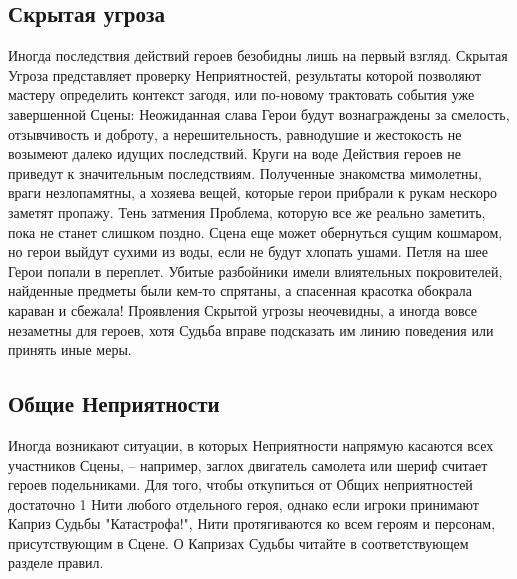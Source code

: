 \subsection{Скрытая угроза}
Иногда последствия действий героев безобидны лишь на первый взгляд. Скрытая Угроза представляет проверку Неприятностей, результаты которой позволяют мастеру определить контекст загодя, или по-новому трактовать события уже завершенной Сцены:
\trouble
{Неожиданная слава}%
{Герои будут вознаграждены за смелость, отзывчивость и доброту, а нерешительность, равнодушие и жестокость не возымеют далеко идущих последствий.}%
{Круги на воде}%
{Действия героев не приведут к значительным последствиям. Полученные знакомства мимолетны, враги незлопамятны, а хозяева вещей, которые герои прибрали к рукам нескоро заметят пропажу.}%
{Тень затмения}%
{Проблема, которую все же реально заметить, пока не станет слишком поздно. Сцена еще может обернуться сущим кошмаром, но герои выйдут сухими из воды, если не будут хлопать ушами.}%
{Петля на шее}%
{Герои попали в переплет. Убитые разбойники имели влиятельных покровителей, найденные предметы были кем-то спрятаны, а спасенная красотка обокрала караван и сбежала!}%
Проявления Скрытой угрозы неочевидны, а иногда вовсе незаметны для героев, хотя Судьба вправе подсказать им линию поведения или принять иные меры. 

\subsection{Общие Неприятности}
Иногда возникают ситуации, в которых Неприятности напрямую касаются всех участников Сцены, – например, заглох двигатель самолета или шериф считает героев подельниками.
\newline Для того, чтобы откупиться от Общих неприятностей достаточно 1 Нити любого отдельного героя, однако если игроки принимают Каприз Судьбы "Катастрофа!", Нити протягиваются ко всем героям и \tbd персонам, присутствующим в Сцене. О Капризах Судьбы читайте в соответствующем разделе правил.

